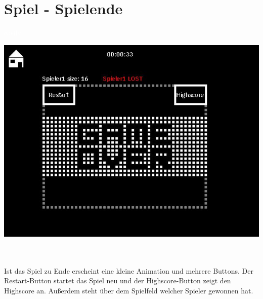 \section{Spiel - Spielende}
\label{Spiel_-_Spielende}
%
\textcolor{white}{easily}
\newline 
\begin{minipage}[X]{1.1\textwidth}
 \centering
 \includegraphics[scale=0.5]{bilder/Spielende}
 \label{fig:spielende}
\end{minipage}
\\ \\ 
	Ist das Spiel zu Ende erscheint eine kleine Animation und mehrere Buttons. Der Restart-Button startet das Spiel neu und der Highscore-Button zeigt den Highscore an. Au{\ss}erdem steht {\"u}ber dem Spielfeld welcher Spieler gewonnen hat.  

%
